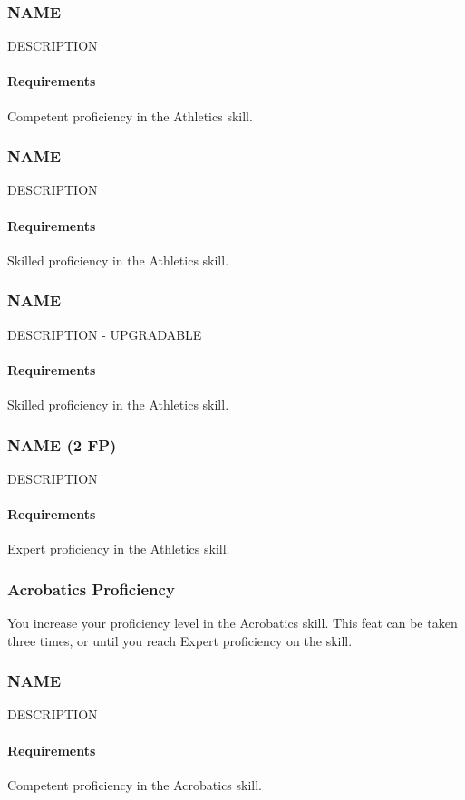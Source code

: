 \subsubsection{NAME} \label{feat::name}
    DESCRIPTION
    \paragraph{Requirements} Competent proficiency in the Athletics skill.
\subsubsection{NAME} \label{feat::name}
    DESCRIPTION
    \paragraph{Requirements} Skilled proficiency in the Athletics skill.
\subsubsection{NAME} \label{feat::name}
    DESCRIPTION - UPGRADABLE
    \paragraph{Requirements} Skilled proficiency in the Athletics skill.
\subsubsection{NAME (2 FP)} \label{feat::name}
    DESCRIPTION
    \paragraph{Requirements} Expert proficiency in the Athletics skill.
\subsubsection{Acrobatics Proficiency} \label{feat::acrobaticsprof}
    You increase your proficiency level in the Acrobatics skill.
    This feat can be taken three times, or until you reach Expert proficiency on the skill.
\subsubsection{NAME} \label{feat::name}
    DESCRIPTION
    \paragraph{Requirements} Competent proficiency in the Acrobatics skill.
